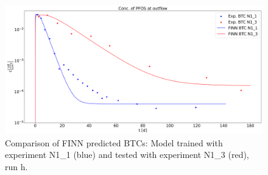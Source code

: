 \begin{figure}[h]
	\centering
	\includegraphics[width=\textwidth]{images/res_btc_exp_FGR_comp_indp.png}
\caption[Comparison of FINN predicted BTCs, run h]{Comparison of FINN predicted BTCs: Model trained with experiment N1\_1 (blue) and tested with experiment N1\_3 (red), run h.}
\label{fig:res_btc_exp_FGR_comp_indp}
\end{figure}
